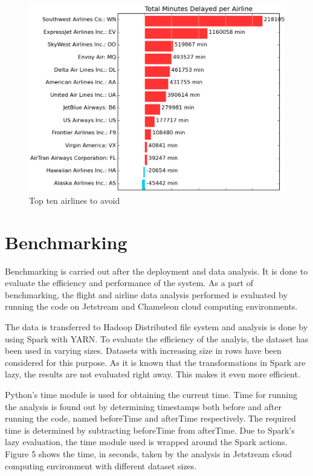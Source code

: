 \documentclass[9pt,twocolumn,twoside]{../../styles/osajnl}
\begin{document}
\begin{figure}[ht]
  \includegraphics[scale=0.40]{images/airlinesAnalysis.eps}
  \caption{Top ten airlines to avoid}
\end{figure}

\section{Benchmarking}

Benchmarking is carried out after the deployment and data analysis. It
is done to evaluate the efficiency and performance of the system. As a
part of benchmarking, the flight and airline data analysis performed
is evaluated by running the code on Jetstream and Chameleon cloud
computing environments.

The data is transferred to Hadoop Distributed file system and analysis
is done by using Spark with YARN. To evaluate the efficiency of the
analyis, the dataset has been used in varying sizes. Datasets with
increasing size in rows have been considered for this purpose. As it
is known that the transformations in Spark are lazy, the results are
not evaluated right away. This makes it even more efficient.

Python's time module is used for obtaining the current time. Time for
running the analysis is found out by determining timestamps both
before and after running the code, named beforeTime and afterTime
respectively. The required time is determined by subtracting
beforeTime from afterTime. Due to Spark's lazy evaluation, the time
module used is wrapped around the Spark actions. Figure 5 shows the
time, in seconds, taken by the analysis in Jetstream cloud computing
environment with different dataset sizes.
\end{document}
